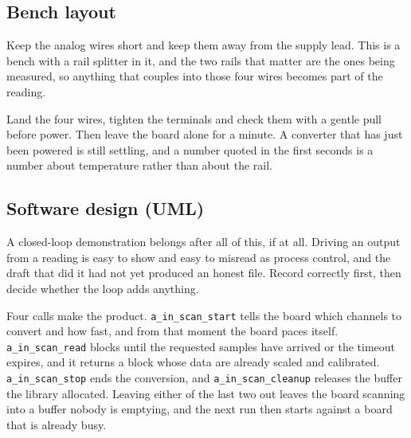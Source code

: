 \subsection*{Bench layout}


Keep the analog wires short and keep them away from the supply lead. This is a bench with a rail splitter in it, and the two rails that matter are the ones being measured, so anything that couples into those four wires becomes part of the reading.

Land the four wires, tighten the terminals and check them with a gentle pull before power. Then leave the board alone for a minute. A converter that has just been powered is still settling, and a number quoted in the first seconds is a number about temperature rather than about the rail.

\subsection*{Software design (UML)}


A closed-loop demonstration belongs after all of this, if at all. Driving an output from a reading is easy to show and easy to misread as process control, and the draft that did it had not yet produced an honest file. Record correctly first, then decide whether the loop adds anything.

Four calls make the product. \texttt{a\_in\_scan\_start} tells the board which channels to convert and how fast, and from that moment the board paces itself. \texttt{a\_in\_scan\_read} blocks until the requested samples have arrived or the timeout expires, and it returns a block whose data are already scaled and calibrated. \texttt{a\_in\_scan\_stop} ends the conversion, and \texttt{a\_in\_scan\_cleanup} releases the buffer the library allocated. Leaving either of the last two out leaves the board scanning into a buffer nobody is emptying, and the next run then starts against a board that is already busy.

